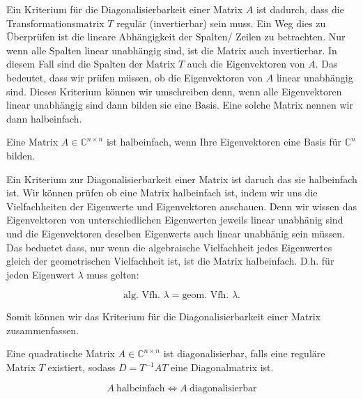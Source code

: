 Ein Kriterium für die Diagonalisierbarkeit einer Matrix \( A \) ist dadurch, dass die Transformationsmatrix \( T \) regulär (invertierbar) sein muss. Ein Weg dies zu Überprüfen ist die lineare Abhängigkeit der Spalten/ Zeilen zu betrachten. Nur wenn alle Spalten linear unabhängig sind, ist die Matrix auch invertierbar. In diesem Fall sind die Spalten der Matrix \( T \) auch die Eigenvektoren von \( A \). Das bedeutet, dass wir prüfen müssen, ob die Eigenvektoren von \( A \) linear unabhängig sind. Dieses Kriterium können wir umschreiben denn, wenn alle Eigenvektoren linear unabhängig sind dann bilden sie eine Basis. Eine solche Matrix nennen wir dann halbeinfach. 

\begin{tcolorbox}[colback=gray!30, colframe=gray!80, title=Halbeinfache Matrizen]
    Eine Matrix \( A \in \mathbb{C}^{n \times n} \) ist halbeinfach, wenn Ihre Eigenvektoren eine Basis für \( \mathbb{C}^n \) bilden. 
\end{tcolorbox}

Ein Kriterium zur Diagonalisierbarkeit einer Matrix ist daruch das sie halbeinfach ist. Wir können prüfen ob eine Matrix halbeinfach ist, indem wir uns die Vielfachheiten der Eigenwerte und Eigenvektoren anschauen. Denn wir wissen das Eigenvektoren von unterschiedlichen Eigenwerten jeweils linear unabhänig sind und die Eigenvektoren deselben Eigenwerts auch linear unabhänig sein müssen. Das beduetet dass, nur wenn die algebraische Vielfachheit jedes Eigenwertes gleich der geometrischen Vielfachheit ist, ist die Matrix halbeinfach. D.h. für jeden Eigenwert \( \lambda \) muss gelten:

\begin{equation*}
    \text{alg. Vfh. } \lambda = \text{geom. Vfh. } \lambda.
\end{equation*}

Somit können wir das Kriterium für die Diagonalisierbarkeit einer Matrix zusammenfassen.

\begin{tcolorbox}[colback=gray!30, colframe=gray!80, title=Halbeinfache Matrizen]
    Eine quadratische Matrix \( A \in \mathbb{C}^{n \times n} \) ist diagonalisierbar, falls eine reguläre Matrix \( T \) existiert, sodass \( D = T^{-1} A T \) eine Diagonalmatrix ist. 

    \begin{equation*}
        A \ \text{halbeinfach} \Leftrightarrow A \ \text{diagonalisierbar}
    \end{equation*}
\end{tcolorbox}

